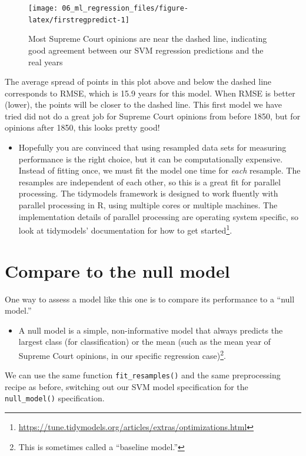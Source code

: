 \documentclass[
]{krantz}
\DeclareRobustCommand{\href}[2]{#2\footnote{\url{#1}}}
\renewcommand{\href}[2]{#2\footnote{\url{#1}}}
\newenvironment{rmdblock}[1]
  {\begin{shaded*}
  \begin{itemize}[left = -1cm, labelsep = 1cm]
  \renewcommand{\labelitemi}{
    \raisebox{-.7\height}[0pt][0pt]{
      {\setkeys{Gin}{width=3em,keepaspectratio}\texttt{[image: images/\#1]}}
    }
  }
 
  \item
  }
  {
  \end{itemize}
  \end{shaded*}
  }
\newenvironment{rmdnote}
  {\begin{rmdblock}{note}}
  {\end{rmdblock}}
\newenvironment{rmdwarning}
  {\begin{rmdblock}{warning}}
  {\end{rmdblock}}
\begin{document}
\begin{figure}

{\centering \texttt{[image: 06\_ml\_regression\_files/figure-latex/firstregpredict-1]} 

}

\caption{Most Supreme Court opinions are near the dashed line, indicating good agreement between our SVM regression predictions and the real years}\label{fig:firstregpredict}
\end{figure}

The average spread of points in this plot above and below the dashed line corresponds to RMSE, which is 15.9 years for this model. When RMSE is better (lower), the points will be closer to the dashed line. This first model we have tried did not do a great job for Supreme Court opinions from before 1850, but for opinions after 1850, this looks pretty good!

\begin{rmdwarning}
Hopefully you are convinced that using resampled data sets for measuring
performance is the right choice, but it can be computationally
expensive. Instead of fitting once, we must fit the model one time for
\emph{each} resample. The resamples are independent of each other, so
this is a great fit for parallel processing. The tidymodels framework is
designed to work fluently with parallel processing in R, using multiple
cores or multiple machines. The implementation details of parallel
processing are operating system specific, so
\href{https://tune.tidymodels.org/articles/extras/optimizations.html}{look
at tidymodels' documentation for how to get started}.
\end{rmdwarning}

\hypertarget{regnull}{%
\section{Compare to the null model}\label{regnull}}

One way to assess a model like this one is to compare its performance to a ``null model.''

\begin{rmdnote}
A null model is a simple, non-informative model that always predicts the largest class (for classification) or the mean (such as the mean year of Supreme Court opinions, in our specific regression case)\footnote{This is sometimes called a ``baseline model.''}.
\end{rmdnote}

We can use the same function \texttt{fit\_resamples()} and the same preprocessing recipe as before, switching out our SVM model specification for the \texttt{null\_model()} specification.
\end{document}
